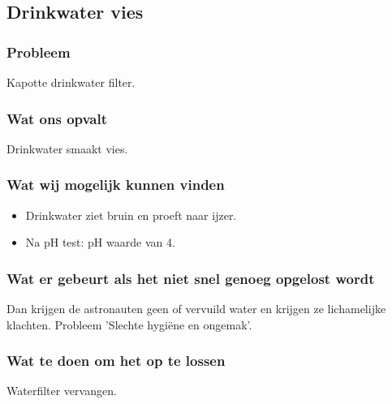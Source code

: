 \subsection{Drinkwater vies}

\subsubsection{Probleem}
Kapotte drinkwater filter.

\subsubsection{Wat ons opvalt}
Drinkwater smaakt vies.

\subsubsection{Wat wij mogelijk kunnen vinden}
\begin{itemize}
    \item Drinkwater ziet bruin en proeft naar ijzer.
    \item Na pH test: pH waarde van 4.
\end{itemize}

\subsubsection{Wat er gebeurt als het niet snel genoeg opgelost wordt}
Dan krijgen de astronauten geen of vervuild water en krijgen ze lichamelijke klachten. Probleem 'Slechte hygiëne en ongemak'.

\subsubsection{Wat te doen om het op te lossen}
Waterfilter vervangen.